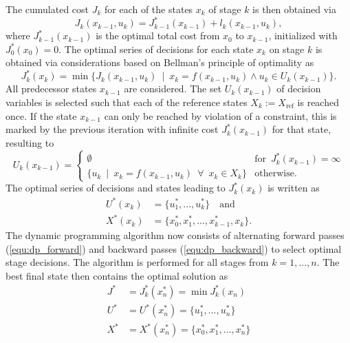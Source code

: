 \documentclass[runningheads]{llncs}
\begin{document}
The cumulated cost $J_k$ for each of the states $x_k$ of stage $k$ is then obtained via
%
\begin{equation}
J_k(x_{k-1},u_k) = J^*_{k-1}(x_{k-1}) + l_k(x_{k-1},u_k),
\label{equ:dp_cumcost}
\end{equation}
%
where $J^*_{k-1}(x_{k-1})$ is the optimal total cost from $x_0$ to $x_{k-1}$, initialized with $J^*_{0}(x_{0}){=}0$.
The optimal series of decisions for each state $x_k$ on stage $k$ is obtained via considerations based on Bellman's principle of optimality as
%
\begin{equation}
J^*_{k}(x_k) = \min{\{J_k(x_{k-1},u_k) 
\enspace | \enspace 
x_k{=}f(x_{k-1},u_k) \land u_k \in U_k(x_{k-1})  \}}.
\label{equ:dp_backward}
\end{equation}
%
All predecessor states $x_{k-1}$ are considered. 
The set $U_k(x_{k-1})$ of decision variables is selected such that each of the reference states $X_k:=X_\mathrm{ref}$ is reached once.
If the state $x_{k-1}$ can only be reached by violation of a constraint, this is marked by the previous iteration with infinite cost $J^*_{k}(x_{k-1})$ for that state, resulting to
%
\begin{equation}
U_k(x_{k-1}) = 
\begin{cases} 
\emptyset &  \mathrm{for} \enspace J^*_{k}(x_{k-1}) = \infty \\
\{ u_k 
\enspace | \enspace
x_k{=}f(x_{k-1},u_k) \enspace \forall \enspace x_k {\in} X_k
\} 
 & \mathrm {otherwise.}
\end{cases}
\label{equ:dp_decisionset}
\end{equation}
%
The optimal series of decisions and states leading to $J^*_{k}(x_k)$ is written as 
%
\begin{align}
U^*(x_k)&=\{u_1^*,...,u_{k}^*\} \quad \mathrm{and} \nonumber \\ X^*(x_k)&=\{x_0^*,x_1^*,...,x_{k-1}^*,x_k\}.
\label{equ:dp_optseries_local}
\end{align}
The dynamic programming algorithm now consists of alternating forward passes (\ref{equ:dp_forward}) and backward passes (\ref{equ:dp_backward}) to select optimal stage decisions.
The algorithm is performed for all stages from $k=1,...,n$.
The best final state then contains the optimal solution as
\begin{align}
J^* &= J^*_{k}(x_{n}^*) = \min{J^*_{k}(x_{n})} \\
U^* &= U^*(x_{n}^*) =\{u_1^*,...,u_{n}^*\} \\
X^* &= X^*(x_{n}^*) = \{x_0^*,x_1^*,...,x_n^*\}
\end{align}
\end{document}
